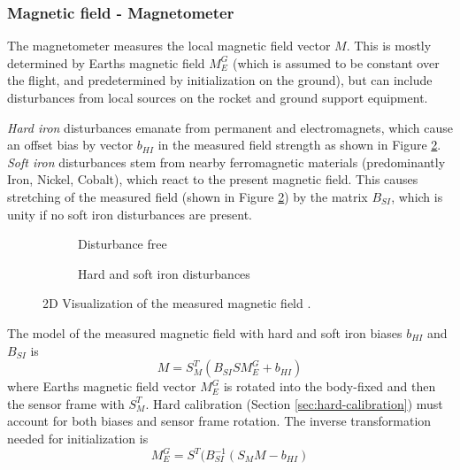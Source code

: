 \subsubsection{Magnetic field - Magnetometer}
The magnetometer measures the local magnetic field vector $M$.
This is mostly determined by Earths magnetic field $M_E^G$ (which is assumed to be constant over the flight, and predetermined by initialization on the ground), but can include disturbances from local sources on the rocket and ground support equipment.

\textit{Hard iron} disturbances emanate from permanent and electromagnets, which cause an offset bias by vector $b_{HI}$ in the measured field strength as shown in Figure \ref{fig:meas-mag-dist}. \\
\textit{Soft iron} disturbances stem from nearby ferromagnetic materials (predominantly Iron, Nickel, Cobalt), which react to the present magnetic field. 
This causes stretching of the measured field (shown in Figure \ref{fig:meas-mag-dist}) by the matrix $B_{SI}$, which is unity if no soft iron disturbances are present.

\begin{figure}[ht!]
    \centering
    \begin{subfigure}{0.4\textwidth}
        \resizebox{0.7\textwidth}{!}{
        }
        \caption{Disturbance free}
        \label{fig:meas-mag-free}
    \end{subfigure}
    \begin{subfigure}{0.4\textwidth}
        \resizebox{0.7\textwidth}{!}{
        }
        \caption{Hard and soft iron disturbances}
        \label{fig:meas-mag-dist}
    \end{subfigure}
    \caption{2D Visualization of the measured magnetic field \cite{vectornav2024}.}
    \label{fig:meas-mag}
\end{figure}

The model of the measured magnetic field with hard and soft iron biases $b_{HI}$ and $B_{SI}$ is 
\begin{equation}
    M = S_M^T ( B_{SI} S M_E^G + b_{HI} ) \label{eq:meas-mag}
\end{equation}
where Earths magnetic field vector $M_E^G$ is rotated into the body-fixed and then the sensor frame with $S_M^T$.
Hard calibration (Section \ref{sec:hard-calibration}) must account for both biases and sensor frame rotation.
The inverse transformation needed for initialization is 
\begin{equation}
    M_E^G = S^T ( B_{SI}^{-1} (S_M M - b_{HI} ) \label{eq:meas-mag-init}
\end{equation}

